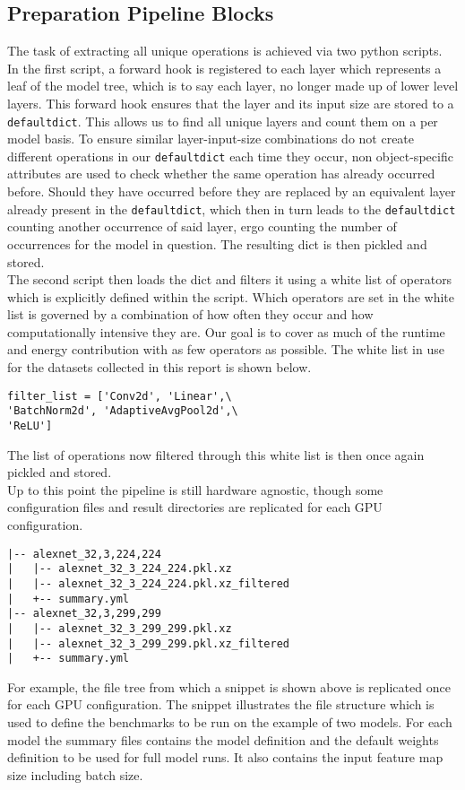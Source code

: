 \documentclass[conference]{IEEEtran}
\begin{document}
\subsection{Preparation Pipeline Blocks}
The task of extracting all unique operations is achieved via two python scripts. \\
In the first script, a forward hook is registered to each layer which represents a leaf of the model tree, which is to say each layer, no longer made up of lower level layers. This forward hook ensures that the layer and its input size are stored to a \texttt{defaultdict}. This allows us to find all unique layers and count them on a per model basis. To ensure similar layer-input-size combinations do not create different operations in our \texttt{defaultdict} each time they occur, non object-specific attributes are used to check whether the same operation has already occurred before. Should they have occurred before they are replaced by an equivalent layer already present in the \texttt{defaultdict}, which then in turn leads to the \texttt{defaultdict} counting another occurrence of said layer, ergo counting the number of occurrences for the model in question. The resulting dict is then pickled and stored. \\
The second script then loads the dict and filters it using a white list of operators which is explicitly defined within the script. Which operators are set in the white list is governed by a combination of how often they occur and how computationally intensive they are. Our goal is to cover as much of the runtime and energy contribution with as few operators as possible. The white list in use for the datasets collected in this report is shown below.
\begin{verbatim}
filter_list = ['Conv2d', 'Linear',\
'BatchNorm2d', 'AdaptiveAvgPool2d',\
'ReLU']
\end{verbatim}
The list of operations now filtered through this white list is then once again pickled and stored. \\
Up to this point the pipeline is still hardware agnostic, though some configuration files and result directories are replicated for each GPU configuration.
\begin{Verbatim}[fontsize=\footnotesize]
|-- alexnet_32,3,224,224
|   |-- alexnet_32_3_224_224.pkl.xz
|   |-- alexnet_32_3_224_224.pkl.xz_filtered
|   +-- summary.yml
|-- alexnet_32,3,299,299
|   |-- alexnet_32_3_299_299.pkl.xz
|   |-- alexnet_32_3_299_299.pkl.xz_filtered
|   +-- summary.yml
\end{Verbatim} 
For example, the file tree from which a snippet is shown above is replicated once for each GPU configuration. The snippet illustrates the file structure which is used to define the benchmarks to be run on the example of two models. For each model the summary files contains the model definition and the default weights definition to be used for full model runs. It also contains the input feature map size including batch size.
\end{document}
